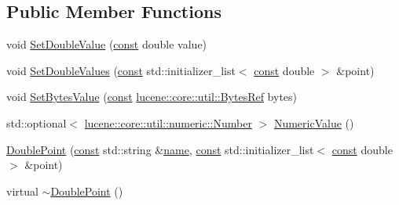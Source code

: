 \subsection*{Public Member Functions}
\begin{DoxyCompactItemize}
\item 
void \mbox{\hyperlink{classlucene_1_1core_1_1document_1_1DoublePoint_a71a14c1578c356e006c422f2c8a267b8}{Set\+Double\+Value}} (\mbox{\hyperlink{ZlibCrc32_8h_a2c212835823e3c54a8ab6d95c652660e}{const}} double value)
\item 
void \mbox{\hyperlink{classlucene_1_1core_1_1document_1_1DoublePoint_afcc80550e3b4ca606c601304782c1998}{Set\+Double\+Values}} (\mbox{\hyperlink{ZlibCrc32_8h_a2c212835823e3c54a8ab6d95c652660e}{const}} std\+::initializer\+\_\+list$<$ \mbox{\hyperlink{ZlibCrc32_8h_a2c212835823e3c54a8ab6d95c652660e}{const}} double $>$ \&point)
\item 
void \mbox{\hyperlink{classlucene_1_1core_1_1document_1_1DoublePoint_af6162d3a002e5cd557b63afea4efee1e}{Set\+Bytes\+Value}} (\mbox{\hyperlink{ZlibCrc32_8h_a2c212835823e3c54a8ab6d95c652660e}{const}} \mbox{\hyperlink{classlucene_1_1core_1_1util_1_1BytesRef}{lucene\+::core\+::util\+::\+Bytes\+Ref}} bytes)
\item 
std\+::optional$<$ \mbox{\hyperlink{classlucene_1_1core_1_1util_1_1numeric_1_1Number}{lucene\+::core\+::util\+::numeric\+::\+Number}} $>$ \mbox{\hyperlink{classlucene_1_1core_1_1document_1_1DoublePoint_aff495d94ea271af89212706b21aa3196}{Numeric\+Value}} ()
\item 
\mbox{\hyperlink{classlucene_1_1core_1_1document_1_1DoublePoint_af18300dfcbaa7b925acef0e6e8a3c103}{Double\+Point}} (\mbox{\hyperlink{ZlibCrc32_8h_a2c212835823e3c54a8ab6d95c652660e}{const}} std\+::string \&\mbox{\hyperlink{classlucene_1_1core_1_1document_1_1Field_a52f673f3b3abb14b180f5159f4726537}{name}}, \mbox{\hyperlink{ZlibCrc32_8h_a2c212835823e3c54a8ab6d95c652660e}{const}} std\+::initializer\+\_\+list$<$ \mbox{\hyperlink{ZlibCrc32_8h_a2c212835823e3c54a8ab6d95c652660e}{const}} double $>$ \&point)
\item 
virtual \mbox{\hyperlink{classlucene_1_1core_1_1document_1_1DoublePoint_a56bcf2eb9f2d4102e9da8f6fa1eddd9d}{$\sim$\+Double\+Point}} ()
\end{DoxyCompactItemize}
